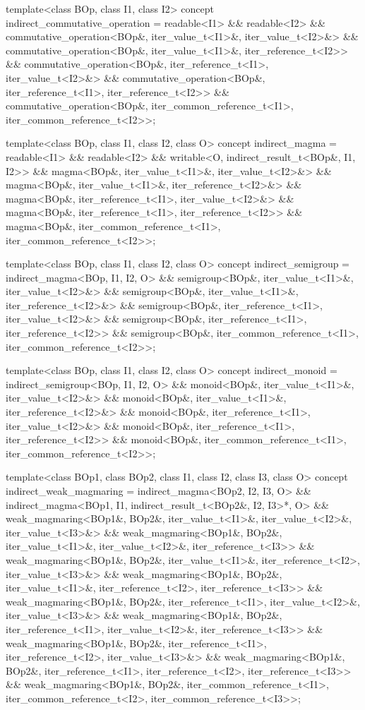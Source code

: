 \begin{itemdecl}
template<class BOp, class I1, class I2>
concept indirect_commutative_operation =
  readable<I1> &&
  readable<I2> &&
  commutative_operation<BOp&, iter_value_t<I1>&, iter_value_t<I2>&> &&
  commutative_operation<BOp&, iter_value_t<I1>&, iter_reference_t<I2>> &&
  commutative_operation<BOp&, iter_reference_t<I1>, iter_value_t<I2>&> &&
  commutative_operation<BOp&, iter_reference_t<I1>, iter_reference_t<I2>> &&
  commutative_operation<BOp&, iter_common_reference_t<I1>, iter_common_reference_t<I2>>;

template<class BOp, class I1, class I2, class O>
concept indirect_magma =
  readable<I1> &&
  readable<I2> &&
  writable<O, indirect_result_t<BOp&, I1, I2>> &&
  magma<BOp&, iter_value_t<I1>&, iter_value_t<I2>&> &&
  magma<BOp&, iter_value_t<I1>&, iter_reference_t<I2>&> &&
  magma<BOp&, iter_reference_t<I1>, iter_value_t<I2>&> &&
  magma<BOp&, iter_reference_t<I1>, iter_reference_t<I2>> &&
  magma<BOp&, iter_common_reference_t<I1>, iter_common_reference_t<I2>>;

template<class BOp, class I1, class I2, class O>
concept indirect_semigroup = indirect_magma<BOp, I1, I2, O> &&
  semigroup<BOp&, iter_value_t<I1>&, iter_value_t<I2>&> &&
  semigroup<BOp&, iter_value_t<I1>&, iter_reference_t<I2>&> &&
  semigroup<BOp&, iter_reference_t<I1>, iter_value_t<I2>&> &&
  semigroup<BOp&, iter_reference_t<I1>, iter_reference_t<I2>> &&
  semigroup<BOp&, iter_common_reference_t<I1>, iter_common_reference_t<I2>>;

template<class BOp, class I1, class I2, class O>
concept indirect_monoid = indirect_semigroup<BOp, I1, I2, O> &&
  monoid<BOp&, iter_value_t<I1>&, iter_value_t<I2>&> &&
  monoid<BOp&, iter_value_t<I1>&, iter_reference_t<I2>&> &&
  monoid<BOp&, iter_reference_t<I1>, iter_value_t<I2>&> &&
  monoid<BOp&, iter_reference_t<I1>, iter_reference_t<I2>> &&
  monoid<BOp&, iter_common_reference_t<I1>, iter_common_reference_t<I2>>;

template<class BOp1, class BOp2, class I1, class I2, class I3, class O>
concept indirect_weak_magmaring =
  indirect_magma<BOp2, I2, I3, O> &&
  indirect_magma<BOp1, I1, indirect_result_t<BOp2&, I2, I3>*, O> &&
  weak_magmaring<BOp1&, BOp2&, iter_value_t<I1>&, iter_value_t<I2>&, iter_value_t<I3>&> &&
  weak_magmaring<BOp1&, BOp2&, iter_value_t<I1>&, iter_value_t<I2>&, iter_reference_t<I3>> &&
  weak_magmaring<BOp1&, BOp2&, iter_value_t<I1>&, iter_reference_t<I2>, iter_value_t<I3>&> &&
  weak_magmaring<BOp1&, BOp2&, iter_value_t<I1>&, iter_reference_t<I2>, iter_reference_t<I3>> &&
  weak_magmaring<BOp1&, BOp2&, iter_reference_t<I1>, iter_value_t<I2>&, iter_value_t<I3>&> &&
  weak_magmaring<BOp1&, BOp2&, iter_reference_t<I1>, iter_value_t<I2>&, iter_reference_t<I3>> &&
  weak_magmaring<BOp1&, BOp2&, iter_reference_t<I1>, iter_reference_t<I2>, iter_value_t<I3>&> &&
  weak_magmaring<BOp1&, BOp2&, iter_reference_t<I1>, iter_reference_t<I2>, iter_reference_t<I3>> &&
  weak_magmaring<BOp1&, BOp2&, iter_common_reference_t<I1>, iter_common_reference_t<I2>,
    iter_common_reference_t<I3>>;


\end{itemdecl}
